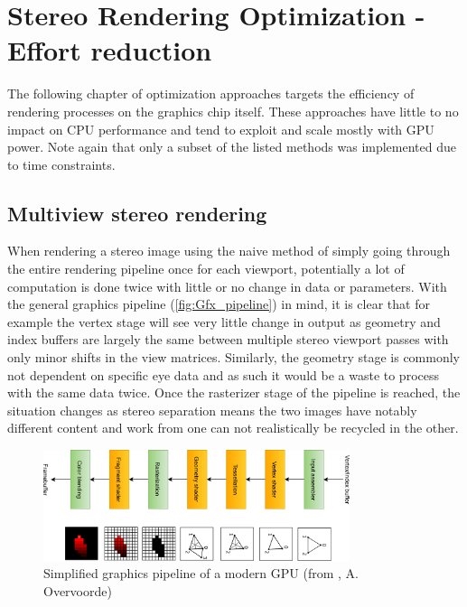 
\chapter{Stereo Rendering Optimization - Effort reduction}
The following chapter of optimization approaches targets the efficiency of rendering processes on the graphics chip itself. These approaches have little to no impact on CPU performance and tend to exploit and scale mostly with GPU power. 
Note again that only a subset of the listed methods was implemented due to time constraints. 

\section{Multiview stereo rendering} \label{MV_Stereo}
When rendering a stereo image using the naive method of simply going through the entire rendering pipeline once for each viewport, potentially a lot of computation is done twice with little or no change in data or parameters. 
With the general graphics pipeline (\autoref{fig:Gfx_pipeline}) in mind, it is clear that for example the vertex stage will see very little change in output as geometry and index buffers are largely the same between multiple stereo viewport passes with only minor shifts in the view matrices. Similarly, the geometry stage is commonly not dependent on specific eye data and as such it would be a waste to process with the same data twice. Once the rasterizer stage of the pipeline is reached, the situation changes as stereo separation means the two images have notably different content and work from one can not realistically be recycled in the other. 

\begin{figure}[htb]
  \centering
  \includegraphics[width=0.8\textwidth]{pictures/vulkan_simplified_pipeline_L}
  \caption{Simplified graphics pipeline of a modern GPU (from \cite{Overvoorde.}, A. Overvoorde)} \label{fig:Gfx_pipeline}
\end{figure}

